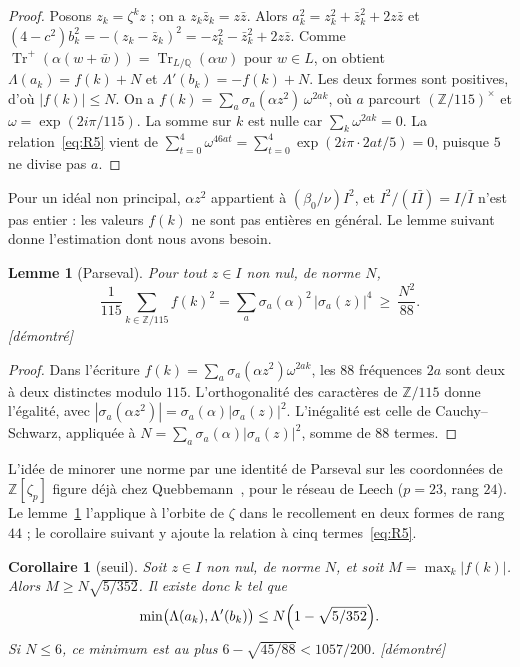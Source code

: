 \documentclass[11pt,a4paper]{amsart}
\theoremstyle{plain}
\newtheorem{lemme}[theoreme]{Lemme}
\newtheorem{corollaire}[theoreme]{Corollaire}
\theoremstyle{definition}
\numberwithin{equation}{section}
\newcommand{\Q}{\mathbb{Q}}
\newcommand{\Z}{\mathbb{Z}}
\DeclareMathOperator{\Tr}{Tr}
\newcommand{\Trp}{\Tr^{+}}
\newcommand{\st}[1]{\textup{\textsf{\small[#1]}}}
\newcommand{\DEM}{\st{démontré}}
\begin{document}
\begin{proof}
Posons $z_k=\zeta^kz$ ; on a $z_k\bar z_k=z\bar z$. Alors $a_k^2=z_k^2+\bar z_k^2+2z\bar z$ et $(4-c^2)b_k^2=-(z_k-\bar z_k)^2=-z_k^2-\bar z_k^2+2z\bar z$. Comme $\Trp(\alpha(w+\bar w))=\Tr_{L/\Q}(\alpha w)$ pour $w\in L$, on obtient $\Lambda(a_k)=f(k)+N$ et $\Lambda'(b_k)=-f(k)+N$. Les deux formes sont positives, d'où $|f(k)|\le N$. On a $f(k)=\sum_a\sigma_a(\alpha z^2)\,\omega^{2ak}$, où $a$ parcourt $(\Z/115)^\times$ et $\omega=\exp(2i\pi/115)$. La somme sur $k$ est nulle car $\sum_k\omega^{2ak}=0$. La relation~\eqref{eq:R5} vient de $\sum_{t=0}^{4}\omega^{46at}=\sum_{t=0}^{4}\exp(2i\pi\cdot2at/5)=0$, puisque $5$ ne divise pas $a$.
\end{proof}

Pour un idéal non principal, $\alpha z^2$ appartient à $(\beta_0/\nu)I^2$, et $I^2/(I\bar I)=I/\bar I$ n'est pas entier : les valeurs $f(k)$ ne sont pas entières en général. Le lemme suivant donne l'estimation dont nous avons besoin.

\begin{lemme}[Parseval]\label{lem:parseval}
Pour tout $z\in I$ non nul, de norme $N$,
\[
\frac1{115}\sum_{k\in\Z/115}f(k)^2=\sum_{a}\sigma_a(\alpha)^2\,|\sigma_a(z)|^4\ \ge\ \frac{N^2}{88}.
\]
\DEM
\end{lemme}

\begin{proof}
Dans l'écriture $f(k)=\sum_a\sigma_a(\alpha z^2)\omega^{2ak}$, les $88$ fréquences $2a$ sont deux à deux distinctes modulo $115$. L'orthogonalité des caractères de $\Z/115$ donne l'égalité, avec $|\sigma_a(\alpha z^2)|=\sigma_a(\alpha)|\sigma_a(z)|^2$. L'inégalité est celle de Cauchy--Schwarz, appliquée à $N=\sum_a\sigma_a(\alpha)|\sigma_a(z)|^2$, somme de $88$ termes.
\end{proof}

L'idée de minorer une norme par une identité de Parseval sur les coordonnées de $\Z[\zeta_p]$ figure déjà chez Quebbemann~\cite[p.~168]{Que81}, pour le réseau de Leech ($p=23$, rang $24$). Le lemme~\ref{lem:parseval} l'applique à l'orbite de $\zeta$ dans le recollement en deux formes de rang $44$ ; le corollaire suivant y ajoute la relation à cinq termes~\eqref{eq:R5}.

\begin{corollaire}[seuil]\label{cor:seuil}
Soit $z\in I$ non nul, de norme $N$, et soit $M=\max_k|f(k)|$. Alors $M\ge N\sqrt{5/352}$. Il existe donc $k$ tel que
\[
\min\bigl(\Lambda(a_k),\Lambda'(b_k)\bigr)\le N\Bigl(1-\sqrt{5/352}\Bigr).
\]
Si $N\le6$, ce minimum est au plus $6-\sqrt{45/88}<1057/200$. \DEM
\end{corollaire}
\end{document}
